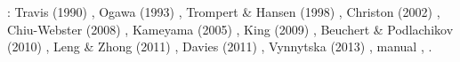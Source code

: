 \Literature: Travis \etal (1990) \cite{trab90},
Ogawa (1993) \cite{ogaw93},
Trompert \& Hansen (1998) \cite{trha98},
Christon \etal (2002) \cite{chgs02},
Chiu-Webster \etal (2008) \cite{chhl08},
Kameyama \etal (2005) \cite{kaks05},
King (2009) \cite{king09},
Beuchert \& Podlachikov (2010) \cite{bepo10},
Leng \& Zhong (2011) \cite{lezh11},
Davies \etal (2011) \cite{dawk11},
Vynnytska \etal (2013) \cite{vyrc13},
\aspect{} manual \cite{aspectmanual},
.




